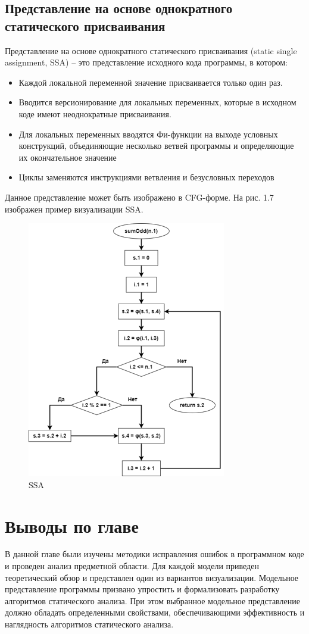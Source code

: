 \subsection{Представление на основе однократного статического присваивания} \label{ch1:subsec-title-abbr}
Представление на основе однократного статического присваивания (static single assignment, SSA) – это представление исходного кода программы, в котором:
\begin{itemize}
\item Каждой локальной переменной значение присваивается только один раз.
\item Вводится версионирование для локальных переменных, которые в исходном коде имеют неоднократные присваивания.
\item Для локальных переменных вводятся Фи-функции на выходе условных конструкций, объединяющие несколько ветвей программы и определяющие их окончательное значение
\item Циклы заменяются инструкциями ветвления и безусловных переходов
\end{itemize}
Данное представление может быть изображено в CFG-форме. На рис. 1.7 изображен пример визуализации SSA.
\begin{figure}[h]
	\center
	\includegraphics [scale=0.9] {my_folder/images/my/7}
	\caption{SSA}
	\label{fig:7}  
\end{figure}
\section{Выводы по главе} \label{ch1:sec3}
В данной главе были изучены методики исправления ошибок в программном коде и проведен анализ предметной области. Для каждой модели приведен теоретический обзор и представлен один из вариантов визуализации. Модельное представление программы призвано упростить и формализовать разработку алгоритмов статического анализа. При этом выбранное модельное представление должно обладать определенными свойствами, обеспечивающими эффективность и наглядность алгоритмов статического анализа.
\newpage